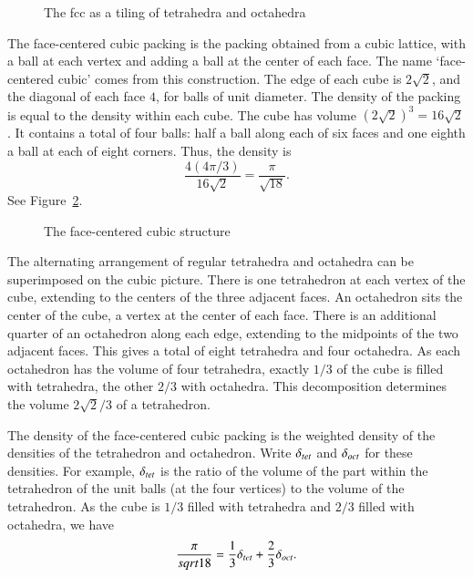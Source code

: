 \begin{figure}[htb]
  \centering
  \caption{The fcc as a tiling of tetrahedra and octahedra}
  \label{fig:tet-oct}
\end{figure}









The face-centered cubic packing is the packing obtained
from a cubic lattice, with a ball at each vertex and adding
a ball at the center of each face.  The name `face-centered cubic' comes from this construction.  The edge of each cube is
$2\sqrt2$, and the diagonal of each face $4$, for balls
of unit diameter.  The density of the packing is equal to the density
within each cube.  The cube has volume $(2\sqrt2)^3 = 16\sqrt2$.
It contains a total of four balls:  half a ball along each
of six faces and one eighth a ball at each of eight corners.
Thus, the density is
   $$
   \frac{   4 (4\pi/3)}{16\sqrt2} = \frac{\pi}{\sqrt{18}}.
   $$
See Figure~\ref{fig:fcc-cube}.

\begin{figure}[htb]
  \centering
  \caption{The face-centered cubic structure}
  \label{fig:fcc-cube}
\end{figure}


The alternating arrangement of regular tetrahedra and octahedra can be
superimposed on the cubic picture.  There is one tetrahedron at each vertex
of the cube, extending to the centers of the three adjacent faces.
An octahedron sits the center of the cube, a vertex
at the center of each face.  There is an additional quarter of an
octahedron along each edge, extending to the midpoints of the two adjacent
faces.  This gives a total of eight tetrahedra and four octahedra.  
As each
octahedron has the volume of four tetrahedra, exactly $1/3$ of
the cube is filled with tetrahedra, the other $2/3$ with octahedra.
This decomposition determines the volume $2\sqrt2/3$ of a tetrahedron.

The density of the face-centered cubic packing is the weighted density
of the densities of the tetrahedron and octahedron.  Write $\delta_{tet}$
and $\delta_{oct}$ for these densities.  For example, $\delta_{tet}$ is the ratio
of the volume
of the part within the tetrahedron of the unit balls (at the four vertices)
to the volume of the tetrahedron.  As the cube is $1/3$ filled  with
tetrahedra and $2/3$ filled with octahedra, we have
$$
  \frac{\pi}{sqrt{18}} = \frac{1}{3}\delta_{tet} + \frac{2}{3}\delta_{oct}.
$$

